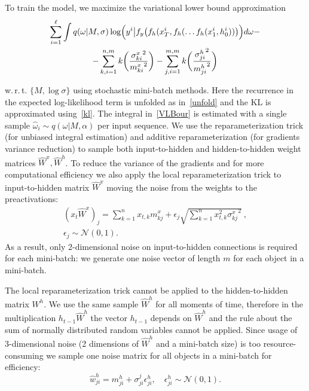 \documentclass{article}
\begin{document}
To train the model, we maximize the variational lower bound approximation 
\begin{gather} 
\sum_{i=1}^\ell \int q(\omega|M, \sigma) \log \Bigl(y^i\big|f_y\bigl(f_h(x^i_T, f_h(\dots f_h (x^i_1, h^i_0))\bigr)\Bigr) d \omega - \notag \\
- \sum_{k,i=1}^{n,m} k\biggl(\frac{{\sigma^x_{ki}}^2}{{m^x_{ki}}^2}\biggr) - \sum_{j,i=1}^{m,m} k\biggl(\frac{{\sigma^h_{ji}}^2}{{m^h_{ji}}^2}\biggr)
\label{VLBour}
\end{gather}

w.\,r.\,t. $\{M, \log \sigma\}$ using stochastic mini-batch methods. Here the recurrence in the expected log-likelihood term is unfolded as in~\eqref{unfold} and the KL is approximated using~\eqref{kl}. The integral in~\eqref{VLBour} is estimated with a single sample $\hat \omega_i \sim q(\omega|M, \alpha)$ per input sequence. 
We use the reparameterization trick (for unbiased integral estimation) and additive reparameterization (for gradients variance reduction) to sample both input-to-hidden and hidden-to-hidden weight matrices $\widehat W^x, \widehat W^h$. To reduce the variance of the gradients and for more computational efficiency we also apply the local reparameterization trick to input-to-hidden matrix $\widehat W^x$ moving the noise from the weights to the preactivations:
\begin{equation}
\begin{gathered}
(x_t \widehat W^x)_j = \sum_{k=1}^n x_{t,k} m^x_{kj}  + 
\epsilon_j \sqrt{\sum_{k=1}^n  x^2_{t,k} {\sigma^x_{kj}}^2}\:, \\
\epsilon_j \sim \mathcal{N}(0, 1).
\end{gathered}
\end{equation}
As a result, only 2-dimensional noise on input-to-hidden connections is required for each mini-batch: we generate one noise vector of length $m$ for each object in a mini-batch.

The local reparameterization trick cannot be applied to the hidden-to-hidden matrix $W^h$. We use the same sample $\widehat W^h$ for all moments of time, therefore in the multiplication $h_{t-1} \widehat W^h$ the vector $h_{t-1}$ depends on $\widehat W^h$ and the rule about the sum of normally distributed random variables cannot be applied. Since usage of 3-dimensional noise (2 dimensions of $\widehat W^h$ and a mini-batch size) is too resource-consuming we sample one noise matrix for all objects in a mini-batch for efficiency:
\begin{equation}
\hat w^h_{ji}=m^h_{ji}+\sigma^j_{ji}\epsilon^h_{ji},\quad \epsilon^h_{ji} \sim \mathcal{N}(0, 1).
\end{equation}
\end{document}

